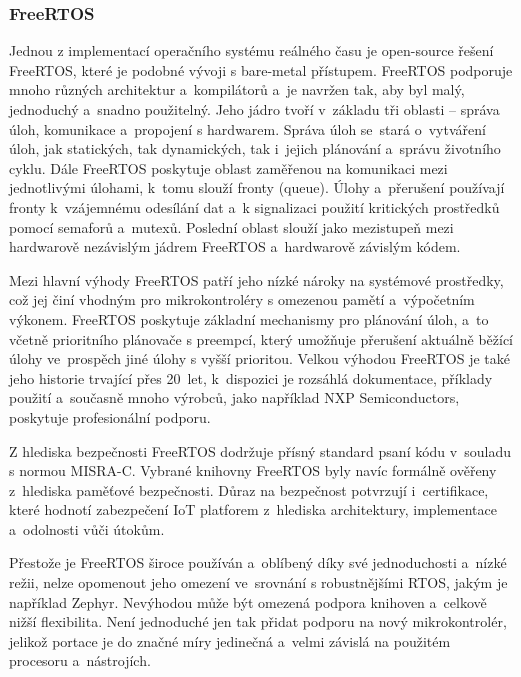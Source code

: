 \subsubsection{FreeRTOS}
Jednou z implementací operačního systému reálného času je open-source řešení FreeRTOS, které je podobné vývoji s bare-metal přístupem. FreeRTOS podporuje mnoho různých architektur a~kompilátorů a~je navržen tak, aby byl malý, jednoduchý a~snadno použitelný. Jeho jádro tvoří v~základu tři oblasti -- správa úloh, komunikace a~propojení s hardwarem. Správa úloh se~stará o~vytváření úloh, jak statických, tak dynamických, tak i~jejich plánování a~správu životního cyklu. Dále FreeRTOS poskytuje oblast zaměřenou na komunikaci mezi jednotlivými úlohami, k~tomu slouží fronty (queue). Úlohy a~přerušení používají fronty k~vzájemnému odesílání dat a~k signalizaci použití kritických prostředků pomocí semaforů a~mutexů. Poslední oblast slouží jako mezistupeň mezi hardwarově nezávislým jádrem FreeRTOS a~hardwarově závislým kódem.~\cite{the_architecture_of_open_source_applications}

Mezi hlavní výhody FreeRTOS patří jeho nízké nároky na systémové prostředky, což jej činí vhodným pro mikrokontroléry s omezenou pamětí a~výpočetním výkonem. FreeRTOS poskytuje základní mechanismy pro plánování úloh, a~to včetně prioritního plánovače s preempcí, který umožňuje přerušení aktuálně běžící úlohy ve~prospěch jiné úlohy s vyšší prioritou. Velkou výhodou FreeRTOS je také jeho historie trvající přes 20~let, k~dispozici je rozsáhlá dokumentace, příklady použití a~současně mnoho výrobců, jako například NXP Semiconductors, poskytuje profesionální podporu.~\cite{freertos_book, the_architecture_of_open_source_applications}


Z hlediska bezpečnosti FreeRTOS dodržuje přísný standard psaní kódu v~souladu s normou MISRA-C. Vybrané knihovny FreeRTOS byly navíc formálně ověřeny z~hlediska paměťové bezpečnosti. Důraz na bezpečnost potvrzují i~certifikace, které hodnotí zabezpečení IoT platforem z~hlediska architektury, implementace a~odolnosti vůči útokům.~\cite{freertos_security}


Přestože je FreeRTOS široce používán a~oblíbený díky své jednoduchosti a~nízké režii, nelze opomenout jeho omezení ve~srovnání s robustnějšími RTOS, jakým je například Zephyr. Nevýhodou může být omezená podpora knihoven a~celkově nižší flexibilita. Není jednoduché jen tak přidat podporu na nový mikrokontrolér, jelikož portace je do značné míry jedinečná a~velmi závislá na použitém procesoru a~nástrojích.~\cite{freertos_portability, freertos_vs_zephyr}

